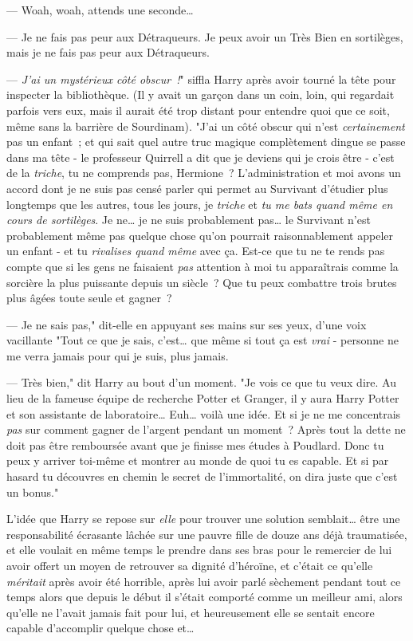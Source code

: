 --- Woah, woah, attends une seconde…

--- Je ne fais pas peur aux Détraqueurs. Je peux avoir un Très Bien en sortilèges, mais je ne fais pas peur aux Détraqueurs.

--- \emph{J'ai un mystérieux côté obscur~!}" siffla Harry après avoir tourné la tête pour inspecter la bibliothèque. (Il y avait un garçon dans un coin, loin, qui regardait parfois vers eux, mais il aurait été trop distant pour entendre quoi que ce soit, même sans la barrière de Sourdinam). "J'ai un côté obscur qui n'est \emph{certainement} pas un enfant~; et qui sait quel autre truc magique complètement dingue se passe dans ma tête - le professeur Quirrell a dit que je deviens qui je crois être - c'est de la \emph{triche}, tu ne comprends pas, Hermione~? L'administration et moi avons un accord dont je ne suis pas censé parler qui permet au Survivant d'étudier plus longtemps que les autres, tous les jours, je \emph{triche} et \emph{tu me bats quand même en cours de sortilèges}. Je ne… je ne suis probablement pas… le Survivant n'est probablement même pas quelque chose qu'on pourrait raisonnablement appeler un enfant - et tu \emph{rivalises quand même} avec ça. Est-ce que tu ne te rends pas compte que si les gens ne faisaient \emph{pas} attention à moi tu apparaîtrais comme la sorcière la plus puissante depuis un siècle~? Que tu peux combattre trois brutes plus âgées toute seule et gagner~?

--- Je ne sais pas," dit-elle en appuyant ses mains sur ses yeux, d'une voix vacillante "Tout ce que je sais, c'est… que même si tout ça est \emph{vrai} - personne ne me verra jamais pour qui je suis, plus jamais.

--- Très bien," dit Harry au bout d'un moment. "Je vois ce que tu veux dire. Au lieu de la fameuse équipe de recherche Potter et Granger, il y aura Harry Potter et son assistante de laboratoire… Euh… voilà une idée. Et si je ne me concentrais \emph{pas} sur comment gagner de l'argent pendant un moment~? Après tout la dette ne doit pas être remboursée avant que je finisse mes études à Poudlard. Donc tu peux y arriver toi-même et montrer au monde de quoi tu es capable. Et si par hasard tu découvres en chemin le secret de l'immortalité, on dira juste que c'est un bonus."

L'idée que Harry se repose sur \emph{elle} pour trouver une solution semblait… être une responsabilité écrasante lâchée sur une pauvre fille de douze ans déjà traumatisée, et elle voulait en même temps le prendre dans ses bras pour le remercier de lui avoir offert un moyen de retrouver sa dignité d'héroïne, et c'était ce qu'elle \emph{méritait} après avoir été horrible, après lui avoir parlé sèchement pendant tout ce temps alors que depuis le début il s'était comporté comme un meilleur ami, alors qu'elle ne l'avait jamais fait pour lui, et heureusement elle se sentait encore capable d'accomplir quelque chose et…

